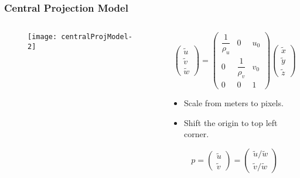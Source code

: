 \begin{frame}
\frametitle{Central Projection Model}
\begin{columns}
\begin{column}{.5\textwidth}
\begin{figure}[!h]
\centering
\texttt{[image: centralProjModel-2]}
\end{figure}
\end{column}
\begin{column}{.5\textwidth}
\[
\left (
\begin{array}{c}
\tilde{u} \\
\tilde{v} \\
\tilde{w}
\end{array}
\right )
=
\left (
\begin{array}{ccc}
\dfrac{1}{\rho_u} & 0 & u_{0} \\
0 & \dfrac{1}{\rho_v} & v_{0} \\
0 & 0 & 1
\end{array}
\right )
\left (
\begin{array}{c}
\tilde{x}\\
\tilde{y}\\
\tilde{z}
\end{array}
\right )
\]
\begin{itemize}
\item Scale from meters to pixels.
\item Shift the origin to top left corner.
\end{itemize}
\[
p =
\left (
\begin{array}{c}
\tilde{u} \\
\tilde{v}
\end{array}
\right )
=
\left (
\begin{array}{c}
\tilde{u}/\tilde{w} \\
\tilde{v}/\tilde{w}
\end{array}
\right )
\]
\end{column}
\end{columns}
\end{frame}

